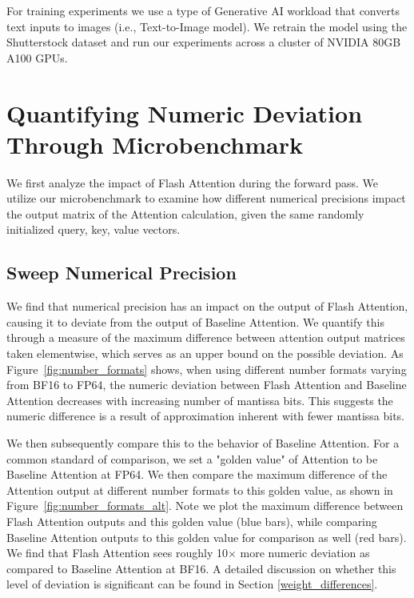 For training experiments we use a type of Generative AI workload that converts text inputs to images (i.e., Text-to-Image model). We retrain the model using the Shutterstock dataset and run our experiments across a cluster of NVIDIA 80GB A100 GPUs.

\section{Quantifying Numeric Deviation Through Microbenchmark} \label{forward_pass}

We first analyze the impact of Flash Attention during the forward pass. We utilize our microbenchmark to examine how different numerical precisions impact the output matrix of the Attention calculation, given the same randomly initialized query, key, value vectors.

\subsection{Sweep Numerical Precision} \label{numerical_precision}
We find that numerical precision has an impact on the output of Flash Attention, causing it to deviate from the output of Baseline Attention. We quantify this through a measure of the maximum difference between attention output matrices taken elementwise, which serves as an upper bound on the possible deviation. As Figure~\ref{fig:number_formats} shows, when using different number formats varying from BF16 to FP64, the numeric deviation between Flash Attention and Baseline Attention decreases with increasing number of mantissa bits. This suggests the numeric difference is a result of approximation inherent with fewer mantissa bits.

We then subsequently compare this to the behavior of Baseline Attention. For a common standard of comparison, we set a "golden value" of Attention to be Baseline Attention at FP64. We then compare the maximum difference of the Attention output at different number formats to this golden value, as shown in Figure~\ref{fig:number_formats_alt}. Note we plot the maximum difference between Flash Attention outputs and this golden value (blue bars), while comparing Baseline Attention outputs to this golden value for comparison as well (red bars). We find that Flash Attention sees roughly 10$\times$ more numeric deviation as compared to Baseline Attention at BF16. A detailed discussion on whether this level of deviation is significant can be found in Section \ref{weight_differences}.

